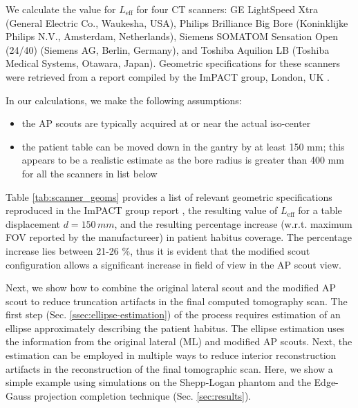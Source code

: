 \documentclass[]{spie}
\begin{document}
We calculate the value for $L_{\mathrm{eff}}$ for four CT scanners: GE LightSpeed Xtra (General Electric Co., Waukesha, USA), Philips Brilliance Big Bore (Koninklijke Philips N.V., Amsterdam, Netherlands), Siemens SOMATOM Sensation Open (24/40) (Siemens AG, Berlin, Germany), and Toshiba Aquilion LB (Toshiba Medical Systems, Otawara, Japan). Geometric specifications for these scanners were retrieved from a report compiled by the ImPACT group, London, UK \cite{ImPACTCenterforEvidencebasedPurchasing2009}. 

In our calculations, we make the following assumptions:
\begin{itemize}
	\item the AP scouts are typically acquired at or near the actual iso-center
	\item the patient table can be moved down in the gantry by at least 150 mm; this appears to be a realistic estimate as the bore radius is greater than 400 mm for all the scanners in list below
\end{itemize}

Table \ref{tab:scanner_geoms} provides a list of relevant geometric specifications reproduced in the ImPACT group report  \cite{ImPACTCenterforEvidencebasedPurchasing2009}, the resulting value of $L_{\mathrm{eff}}$ for a table displacement $d = 150 \, mm$, and the resulting percentage increase (w.r.t. maximum FOV reported by the manufactureer) in patient habitus coverage. The percentage increase lies between 21-26 \%, thus it is evident that the modified scout configuration allows a significant increase in field of view in the AP scout view. 

Next, we show how to combine the original lateral scout and the modified AP scout to reduce truncation artifacts in the final computed tomography scan. The first step (Sec. \ref{ssec:ellipse-estimation}) of the process requires estimation of an ellipse approximately describing the patient habitus. The ellipse estimation uses the information from the original lateral (ML) and modified AP scouts. Next, the estimation can be employed in multiple ways to reduce interior reconstruction artifacts in the reconstruction of the final tomographic scan. Here, we show a simple example using simulations on the Shepp-Logan phantom and the Edge-Gauss projection completion technique \cite{Hoppe2008} (Sec. \ref{sec:results}). 
\end{document}
